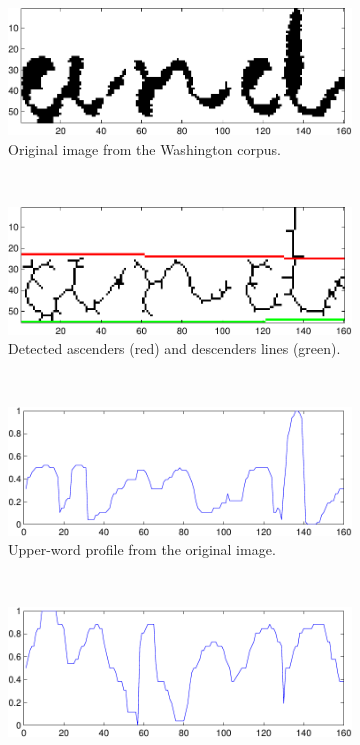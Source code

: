\documentclass[10pt,a4paper]{article}
\begin{document}
\begin{figure}[h]
\centering
\begin{subfigure}[b]{0.45\textwidth}
\centering
\includegraphics[width=\textwidth]{imgs/and_orig-crop.pdf}
\caption{Original image from the Washington corpus.}
\label{fig:img_original}
\end{subfigure}
~
\begin{subfigure}[b]{0.45\textwidth}
\centering
\includegraphics[width=\textwidth]{imgs/and_asc_des-crop.pdf}
\caption{Detected ascenders (red) and descenders lines (green).}
\label{fig:img_features_ascdes}
\end{subfigure}
\\
\begin{subfigure}[b]{0.45\textwidth}
\centering
\includegraphics[width=\textwidth]{imgs/and_upper-crop.pdf}
\caption{Upper-word profile from the original image.}
\label{fig:img_features_upper}
\end{subfigure}
~
\begin{subfigure}[b]{0.45\textwidth}
\centering
\includegraphics[width=\textwidth]{imgs/and_lower-crop.pdf}

\end{subfigure}
\end{figure}
\end{document}
